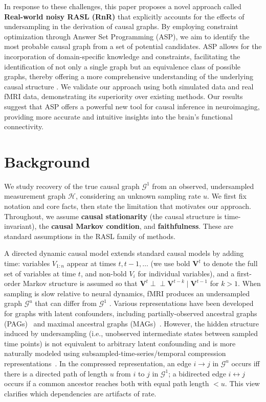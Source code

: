 In response to these challenges, this paper proposes a novel approach called \textbf{Real-world noisy RASL (RnR)} that explicitly accounts for the effects of undersampling in the derivation of causal graphs. By employing constraint optimization through Answer Set Programming (ASP), we aim to identify the most probable causal graph from a set of potential candidates. ASP allows for the incorporation of domain-specific knowledge and constraints, facilitating the identification of not only a single graph but an equivalence class of possible graphs, thereby offering a more comprehensive understanding of the underlying causal structure \citep{gebser2012conflict}. We validate our approach using both simulated data and real fMRI data, demonstrating its superiority over existing methods. Our results suggest that ASP offers a powerful new tool for causal inference in neuroimaging, providing more accurate and intuitive insights into the brain's functional connectivity.






\section{Background}
\label{sec:background}
We study recovery of the true causal graph \(\mathcal{G}^1\) from an observed, undersampled measurement graph \(\mathcal{H}\), considering an unknown sampling rate \(u\). We first fix notation and core facts, then state the limitation that motivates our approach. Throughout, we assume \textbf{causal stationarity} (the causal structure is time-invariant), the \textbf{causal Markov condition}, and \textbf{faithfulness}. These are standard assumptions in the RASL family of methods.

A directed dynamic causal model extends standard causal models \citep{pearl2000models,spirtes2000causation} by adding time: variables \(V_{1:n}\) appear at times \(t,t-1,\ldots\) (we use bold \(\mathbf{V}^t\) to denote the full set of variables at time \(t\), and non-bold \(V_i\) for individual variables), and a first-order Markov structure is assumed so that \(\mathbf{V}^t \!\perp\!\!\!\perp \mathbf{V}^{t-k}\mid \mathbf{V}^{t-1}\) for \(k>1\). When sampling is slow relative to neural dynamics, fMRI produces an undersampled graph \(\mathcal{G}^u\) that can differ from \(\mathcal{G}^1\) \citep{gong2015discovering}. Various representations have been developed for graphs with latent confounders, including partially-observed ancestral graphs (PAGs)~\cite{richardson2002ancestral} and maximal ancestral graphs (MAGs)~\cite{zhang2008causal}. However, the hidden structure induced by undersampling (i.e., unobserved intermediate states between sampled time points) is not equivalent to arbitrary latent confounding and is more naturally modeled using subsampled-time-series/temporal compression representations~\cite{danks2013learning}. In the compressed representation, an edge \(i\!\to\!j\) in \(\mathcal{G}^u\) occurs iff there is a directed path of length \(u\) from \(i\) to \(j\) in \(\mathcal{G}^1\); a bidirected edge \(i\!\leftrightarrow\!j\) occurs if a common ancestor reaches both with equal path length \(<u\). This view clarifies which dependencies are artifacts of rate.

